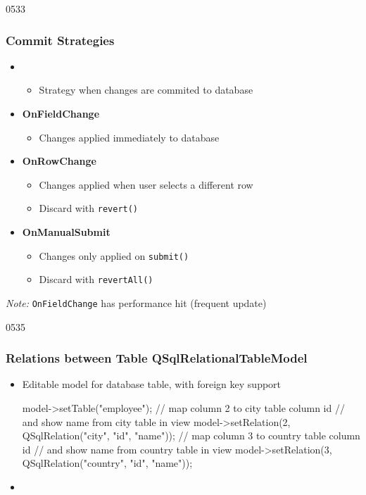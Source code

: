 \begin{slide}{0533}\frametitle{Commit Strategies}
\begin{itemize}
\item {}
  \begin{itemize}
  \item Strategy when changes are commited to database
  \end{itemize}
\medskip
\item \textbf{OnFieldChange}
  \begin{itemize}
  \item Changes applied immediately to database
  \end{itemize}
\item \textbf{OnRowChange}
  \begin{itemize}
  \item Changes applied when user selects a different row
  \item Discard with \texttt{revert()}
  \end{itemize}
\item \textbf{OnManualSubmit}
  \begin{itemize}
  \item Changes only applied on \texttt{submit()}
  \item Discard with \texttt{revertAll()}
  \end{itemize}
\end{itemize}
\medskip
\begin{footnotesize}
\emph{Note:} \texttt{OnFieldChange} has performance hit (frequent update)
\end{footnotesize}
\end{slide}

\begin{slide}[fragile]{0535}\frametitle{Relations between Table QSqlRelationalTableModel}
\begin{itemize}
\item Editable model for database table, with foreign key support
  \begin{cpp}
model->setTable("employee");
// map column 2 to city table column id
// and show name from city table in view
model->setRelation(2, QSqlRelation("city", "id", "name"));
// map column 3 to country table column id 
// and show name from country table in view
model->setRelation(3, QSqlRelation("country", "id", "name"));    
  \end{cpp}
\medskip

\item {}
\end{itemize}
\end{slide}

